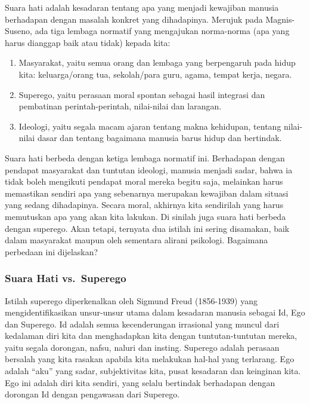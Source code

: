\documentclass[10pt,a4paper]{article}
\def\tightlist{}
\begin{document}
\begin{multicols}{2}
Suara hati adalah kesadaran tentang apa yang menjadi kewajiban manusia
berhadapan dengan masalah konkret yang dihadapinya. Merujuk pada
Magnis-Suseno, ada tiga lembaga normatif yang mengajukan norma-norma
(apa yang harus dianggap baik atau tidak) kepada kita:

\begin{enumerate}
\def\labelenumi{\arabic{enumi}.}
\tightlist
\item
  Masyarakat, yaitu semua orang dan lembaga yang berpengaruh pada hidup
  kita: keluarga/orang tua, sekolah/para guru, agama, tempat kerja,
  negara.
\item
  Superego, yaitu perasaan moral spontan sebagai hasil integrasi dan
  pembatinan perintah-perintah, nilai-nilai dan larangan.
\item
  Ideologi, yaitu segala macam ajaran tentang makna kehidupan, tentang
  nilai-nilai dasar dan tentang bagaimana manusia barus hidup dan
  bertindak.
\end{enumerate}

Suara hati berbeda dengan ketiga lembaga normatif ini. Berhadapan dengan
pendapat masyarakat dan tuntutan ideologi, manusia menjadi sadar, bahwa
ia tidak boleh mengikuti pendapat moral mereka begitu saja, melainkan
harus memastikan sendiri apa yang sebenarnya merupakan kewajiban dalam
situasi yang sedang dihadapinya. Secara moral, akhirnya kita sendirilah
yang harus memutuskan apa yang akan kita lakukan. Di sinilah juga suara
hati berbeda dengan superego. Akan tetapi, ternyata dua istilah ini
sering disamakan, baik dalam masyarakat maupun oleh sementara alirani
psikologi. Bagaimana perbedaan ini dijelaskan?

\hypertarget{suara-hati-vs.-superego}{%
\subsubsection{Suara Hati vs.~Superego}\label{suara-hati-vs.-superego}}

Istilah superego diperkenalkan oleh Sigmund Freud (1856-1939) yang
mengidentifikasikan unsur-unsur utama dalam kesadaran manusia sebagai
Id, Ego dan Superego. Id adalah semua kecenderungan irrasional yang
muncul dari kedalaman diri kita dan menghadapkan kita dengan
tuntutan-tuntutan mereka, yaitu segala dorongan, nafsu, naluri dan
insting. Superego adalah perasaan bersalah yang kita rasakan apabila
kita melakukan hal-hal yang terlarang. Ego adalah ``aku'' yang sadar,
subjektivitas kita, pusat kesadaran dan keinginan kita. Ego ini adalah
diri kita sendiri, yang selalu bertindak berhadapan dengan dorongan Id
dengan pengawasan dari Superego.


\end{multicols}
\end{document}
